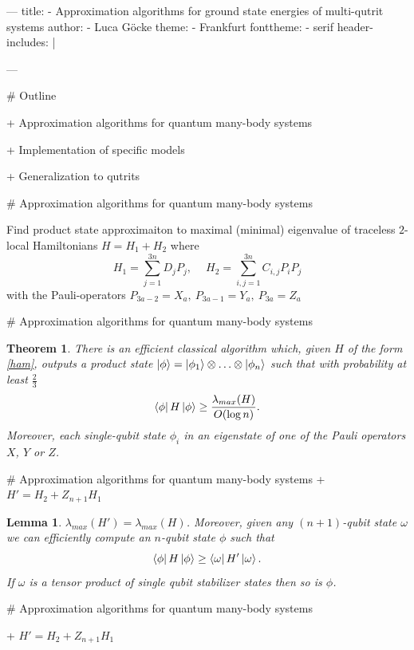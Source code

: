 ---
title:
- Approximation algorithms for ground state energies of multi-qutrit systems
author:
- Luca Göcke
theme:
- Frankfurt
fonttheme:
- serif
header-includes: |
	\usepackage{braket}
	\usepackage{dsfont}
	\usepackage{bm}
	\newtheorem{lma}{Lemma}
	\newtheorem{thm}{Theorem}
---


# Outline

+ Approximation algorithms for quantum many-body systems

+ Implementation of specific models

+ Generalization to qutrits


# Approximation algorithms for quantum many-body systems

\begin{center}
Find product state approximaiton to maximal (minimal) eigenvalue of traceless $2$-local Hamiltonians $H = H_1+H_2$ where
\begin{equation}\label{ham}
	H_1 = \sum_{j=1}^{3n} D_jP_j,\quad ~ H_2  = \sum_{i,j=1}^{3n} C_{i,j}P_iP_j
\end{equation}
with the Pauli-operators $P_{3a-2}=X_a, ~ P_{3a-1}=Y_a, ~ P_{3a}=Z_a$
\end{center}


# Approximation algorithms for quantum many-body systems

\begin{thm}\emph{
		There is an efficient classical algorithm which, given $H$ of the form \eqref{ham}, outputs a product state $\ket{\phi} = \ket{\phi_1}\otimes\ldots\otimes \ket{\phi_n}$ such that with probability at least $\frac{2}{3}$
			$$\bra{\phi}H\ket{\phi}\ge \frac{\lambda_{max}(H)}{O(\log{}n)}.$$
Moreover, each single-qubit state $\phi_i$ in an eigenstate of one of the Pauli operators $X$, $Y$ or $Z$.
}\end{thm}


# Approximation algorithms for quantum many-body systems
+ $H'=H_2+Z_{n+1}H_1$
\begin{lma}
	\emph{$\lambda_{max}\left( H' \right) =\lambda_{max}\left( H \right)$. Moreover, given any $(n+1)$-qubit state  $\omega$ we can efficiently compute an $n$-qubit state $\phi$ such that $$ \bra{\phi}H\ket{\phi} \ge \bra{\omega}H'\ket{\omega}.$$
If $\omega$ is a tensor product of single qubit stabilizer states then so is $\phi$.}
\end{lma}

# Approximation algorithms for quantum many-body systems

+ $H'=H_2+Z_{n+1}H_1$

